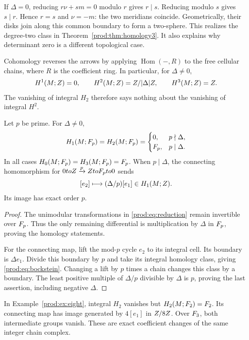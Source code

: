 If $\Delta=0$, reducing $r\nu+sm=0$ modulo $r$ gives $r\mid s$.
Reducing modulo $s$ gives $s\mid r$.  Hence $r=s$ and $\nu=-m$:
the two meridians coincide.  Geometrically, their disks join along this
common boundary to form a two-sphere.  This realizes the degree-two
class in Theorem~\ref{prod:thm:homology3}.
It also explains why determinant zero is a different topological case.

Cohomology reverses the arrows by applying $\operatorname{Hom}(-,R)$
to the free cellular chains, where $R$ is the coefficient ring.
In particular, for $\Delta\ne0$,
\[
 H^1(M;Z)=0,\qquad H^2(M;Z)=Z/|\Delta|Z,
 \qquad H^3(M;Z)=Z.
\]
The vanishing of integral $H_2$ therefore says nothing about the
vanishing of integral $H^2$.

\begin{proposition}\label{prod:prop:prime}
Let $p$ be prime.  For $\Delta\ne0$,
\[
 H_1(M;F_p)=H_2(M;F_p)=
 \begin{cases}0,&p\nmid\Delta,\\F_p,&p\mid\Delta.
 \end{cases}
\]
In all cases $H_0(M;F_p)=H_3(M;F_p)=F_p$.
When $p\mid\Delta$, the connecting homomorphism for
$0toZ\xrightarrow{p}ZtoF_pto0$ sends
\begin{equation}\label{prod:eq:bockstein}
 [e_2]\longmapsto (\Delta/p)[e_1]\in H_1(M;Z).
\end{equation}
Its image has exact order $p$.
\end{proposition}

\begin{proof}
The unimodular transformations in \eqref{prod:eq:reduction} remain
invertible over $F_p$.  Thus the only remaining differential is
multiplication by $\Delta$ in $F_p$, proving the homology statements.

For the connecting map, lift the mod-$p$ cycle $e_2$ to its integral
cell.  Its boundary is $\Delta e_1$.  Divide this boundary by $p$
and take its integral homology class, giving \eqref{prod:eq:bockstein}.
Changing a lift by $p$ times a chain changes this class by a boundary.
The least positive multiple of $\Delta/p$ divisible by $\Delta$
is $p$, proving the last assertion, including negative $\Delta$.
\end{proof}

In Example~\ref{prod:ex:eight}, integral $H_2$ vanishes but
$H_2(M;F_2)=F_2$.  Its connecting map has image generated by
$4[e_1]$ in $Z/8Z$.  Over $F_3$, both intermediate groups vanish.
These are exact coefficient changes of the same integer chain complex.

